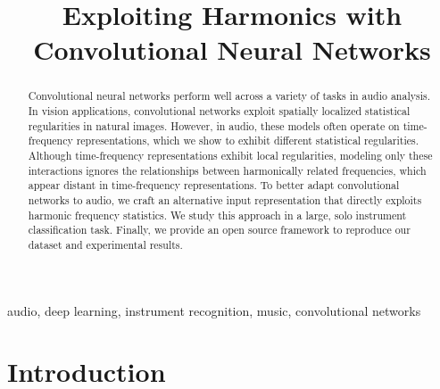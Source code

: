 \documentclass{article}
\title{Exploiting Harmonics with Convolutional Neural Networks}
\def\eg{\emph{e.g.}}
\begin{document}
%
\maketitle
%
\begin{abstract}

Convolutional neural networks perform well across a variety of tasks in audio analysis.
In vision applications, convolutional networks exploit spatially localized statistical regularities in natural images.
However, in audio, these models often operate on time-frequency representations, which we show to exhibit different statistical regularities.
Although time-frequency representations exhibit local regularities, modeling only these interactions ignores the relationships between harmonically related frequencies, which appear distant in time-frequency representations.
To better adapt convolutional networks to audio, we craft an alternative input representation that directly exploits harmonic frequency statistics.
We study this approach in a large, solo instrument classification task.
Finally, we provide an open source framework to reproduce our dataset and experimental results.
\end{abstract}

\begin{keywords}
    audio, deep learning, instrument recognition, music, convolutional networks
\end{keywords}
\section{Introduction}\label{sec:introduction}

\end{document}
